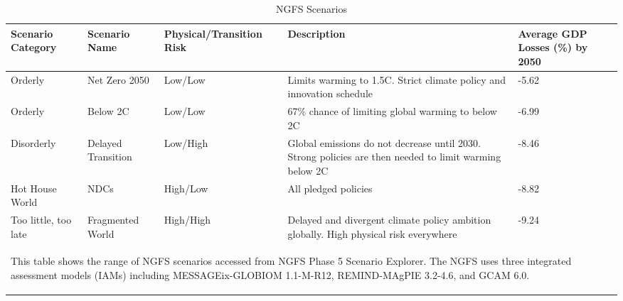 
\begin{table}[tb!]
\footnotesize
\center
\caption{NGFS Scenarios}
\label{tab:Scenario}
\begin{tabularx}{\textwidth}{X X X X X}
\hline
Scenario Category & Scenario Name & Physical/Transition Risk & Description & Average GDP Losses (\%) by 2050\\
\hline
Orderly & Net Zero 2050 & Low/Low & Limits warming to 1.5C. Strict climate policy and innovation schedule &  -5.62 \\
Orderly & Below 2C & Low/Low & 67\% chance of limiting global warming to below 2C &  -6.99 \\
Disorderly & Delayed Transition & Low/High & Global emissions do not decrease until 2030. Strong policies are then needed to limit warming below 2C &  -8.46 \\
Hot House World & NDCs & High/Low & All pledged policies &  -8.82 \\
Too little, too late & Fragmented World & High/High & Delayed and divergent climate policy ambition globally. High physical risk everywhere &  -9.24 \\
\hline
\multicolumn{5}{p{\textwidth}}{\begin{footnotesize}This table shows the range of NGFS scenarios accessed from NGFS Phase 5 Scenario Explorer. The NGFS uses three integrated assessment models (IAMs) including MESSAGEix-GLOBIOM 1.1-M-R12, REMIND-MAgPIE 3.2-4.6, and GCAM 6.0.
\end{footnotesize}
}
\end{tabularx}
\end{table}
